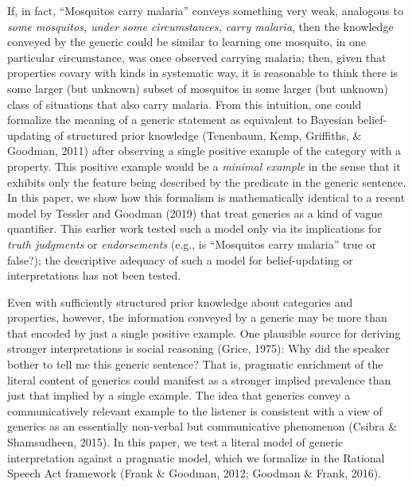 \documentclass[floatsintext,doc]{apa6}
\begin{document}
If, in fact, \enquote{Mosquitos carry malaria} conveys something very weak, analogous to \emph{some mosquitos, under some circumstances, carry malaria}, then the knowledge conveyed by the generic could be similar to learning one mosquito, in one particular circumstance, was once observed carrying malaria; then, given that properties covary with kinds in systematic way, it is reasonable to think there is some larger (but unknown) subset of mosquitos in some larger (but unknown) class of situations that also carry malaria.
From this intuition, one could formalize the meaning of a generic statement as equivalent to Bayesian belief-updating of structured prior knowledge (Tenenbaum, Kemp, Griffiths, \& Goodman, 2011) after observing a single positive example of the category with a property.
This positive example would be a \emph{minimal example} in the sense that it exhibits only the feature being described by the predicate in the generic sentence.
In this paper, we show how this formalism is mathematically identical to a recent model by Tessler and Goodman (2019) that treat generics as a kind of vague quantifier.
This earlier work tested such a model only via its implications for \emph{truth judgments} or \emph{endorsements} (e.g., is \enquote{Mosquitos carry malaria} true or false?); the descriptive adequacy of such a model for belief-updating or interpretations has not been tested.

Even with sufficiently structured prior knowledge about categories and properties, however, the information conveyed by a generic may be more than that encoded by just a single positive example.
One plausible source for deriving stronger interpretations is social reasoning (Grice, 1975): Why did the speaker bother to tell me this generic sentence?
That is, pragmatic enrichment of the literal content of generics could manifest as a stronger implied prevalence than just that implied by a single example.
The idea that generics convey a communicatively relevant example to the listener is consistent with a view of generics as an essentially non-verbal but communicative phenomenon (Csibra \& Shamsudheen, 2015).
In this paper, we test a literal model of generic interpretation against a pragmatic model, which we formalize in the Rational Speech Act framework (Frank \& Goodman, 2012; Goodman \& Frank, 2016).
\end{document}
